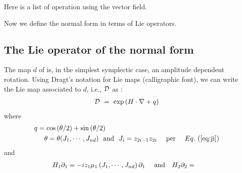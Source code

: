 \documentclass{hitec}     %
\begin{document}
{{{{{{{{{{{{{{{{{{Here is a list of operation using the vector field.
\begin{code}

\end{code}


Now we define the normal form in terms of Lie operators.
 
  \subsection{The Lie operator of the normal form}\label{s:lienorm}

The map $d$ of  is, in the simplest symplectic case, an amplitude dependent rotation. Using Dragt's notation for Lie maps (calligraphic font), we can write the Lie map associated to $d$, i.e., $\cal D$ as :
%
\begin{align} {\cal D}\ =
\ \exp\left({H\cdot \nabla +q}\right)  \label{eq:lied}\end{align}
%
where
%
\begin{align} q&=\cos\left({\theta /2}\right) + \sin\left({\theta /2}\right)\ \ \ \label{eq:qnorm}\ \  \\ \ &\ \ \ \theta =
\theta ({J}_{1},\cdots,{J}_{nd})~~{\rm a}{\rm n}{\rm d} ~~{J}_{i}=
{z}_{2i-1}{z}_{2i}\ \ \ \ {\rm p}{\rm e}{\rm r}\ \ \ \ \Eq{eq:ji} \nonumber 
\end{align}
and
%
\begin{align} {H}_{1}{\partial }_{1}&=-i{z}_{1}{\mu }_{1}\left({{J}_{1},\cdots,{J}_{nd}}\right){\partial }_{1}\ ~~~{\rm a}{\rm n}{\rm d} ~~~{H}_{2}{\partial }_{2}=

\end{align}}}}}}}}}}}}}}}}}}}
\end{document}
